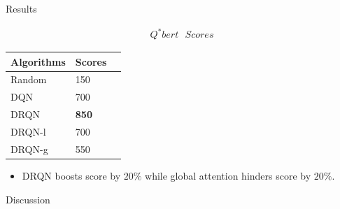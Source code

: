 \documentclass[final]{beamer}
\newlength{\onecolwid}
\begin{document}
\begin{frame}[t]
\begin{columns}[t]
\begin{column}{\onecolwid} %


\begin{block}{Results}

\begin{gather*}
	Q^{\ast}bert \text{ } Scores
\end{gather*}

\begin{table}
    \vspace{2ex}
    \begin{tabular}{l l l}
        \toprule
            \textbf{Algorithms} & \textbf{Scores} \\
        \midrule
            Random & 150 \\
            DQN & 700 \\
            DRQN & \textbf{850} \\
            DRQN-l & 700 \\
            DRQN-g & 550 \\
        \bottomrule
    \end{tabular}
\end{table}

\begin{itemize}
    \item DRQN boosts score by $20\%$ while global attention hinders score by
        $20\%$.
\end{itemize}

\end{block}


\begin{block}{Discussion}


\end{block}
\end{column}
\end{columns}
\end{frame}
\end{document}
